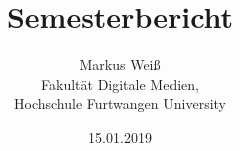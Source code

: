 \documentclass[a4paper,12pt]{scrreprt}
\begin{document}
\setlength{\parindent}{0em}

\pagestyle{empty}

\cleardoubleoddpage




\title{Semesterbericht}
\date{15.01.2019}
\author{
Markus Weiß\\
Fakultät Digitale Medien,\\
Hochschule Furtwangen University\\
}
\maketitle

\tableofcontents


















\end{document}
